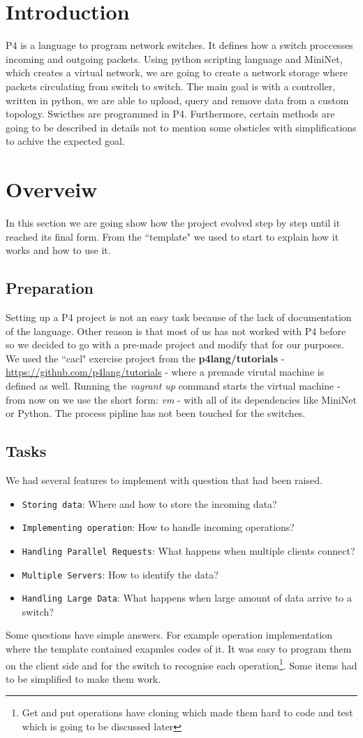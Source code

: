 \documentclass[sigconf,natbib=false]{acmart}
\begin{document}
\section{Introduction}
P4 is a language to program network switches. It defines how a switch proccesses incoming and outgoing packets. Using python scripting language and MiniNet, which creates a virtual network, we are going to create a network storage where packets circulating from switch to switch. The main goal is with a controller, written in python, we are able to upload, query and remove data from a custom topology. Swicthes are programmed in P4. Furthermore, certain methods are going to be described in details not to mention some obsticles with simplifications to achive the expected goal.

\section{Overveiw}
In this section we are going show how the project evolved step by step until it reached its final form. From the ``template" we used to start to explain how it works and how to use it.
\subsection{Preparation}
Setting up a P4 project is not an easy task because of the lack of documentation of the language. Other reason is that most of us has not worked with P4 before so we decided to go with a pre-made project and modify that for our purposes. We used the ``cacl" exercise project from the \textbf{p4lang/tutorials} - \url{https://github.com/p4lang/tutorials} - where a premade virutal machine is defined as well. Running the \textit{vagrant up} command starts the virtual machine - from now on we use the short form: \textit{vm} -  with all of its dependencies like MiniNet or Python. The process pipline has not been touched for the switches.
\subsection{Tasks}
We had several features to implement with question that had been raised.
\begin{itemize}
	\item {\verb|Storing data|}: Where and how to store the incoming data?
	\item{\verb|Implementing operation|}: How to handle incoming operations?
	\item{\verb|Handling Parallel Requests|}: What happens when multiple clients connect?
	\item{\verb|Multiple Servers|}: How to identify the data?
	\item{\verb|Handling Large Data|}: What happens when large amount of data arrive to a switch?
\end{itemize}
Some questions have simple answers. For example operation implementation where the template contained exapmles codes of it. It was easy to program them on the client side and for the switch to recognise each operation\footnote{Get and put operations have cloning which made them hard to code and test which is going to be discussed later}. Some items had to be simplified to make them work.
\end{document}
